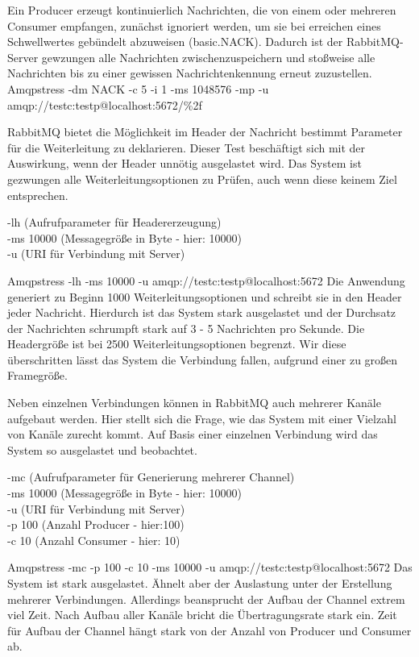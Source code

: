 \documentclass[	a4paper,
			11pt,
			titlepage,
			oneside,
			fleqn,
			listof=totoc,
			parskip,
			chapterprefix=false,
			numbers=noenddot]{scrreprt}
\begin{document}
	
		{Ein Producer erzeugt kontinuierlich Nachrichten, die von einem oder mehreren Consumer empfangen, zunächst ignoriert werden, um sie bei erreichen eines Schwellwertes gebündelt abzuweisen (basic.NACK). Dadurch ist der RabbitMQ-Server gewzungen alle Nachrichten zwischenzuspeichern und stoßweise alle Nachrichten bis zu einer gewissen Nachrichtenkennung erneut zuzustellen.}%
		{}%
		{Amqpstress -dm NACK -c 5 -i 1 -ms 1048576 -mp -u amqp://testc:testp@localhost:5672/\%2f}%
		{}
		
		
		{RabbitMQ bietet die Möglichkeit im Header der Nachricht bestimmt Parameter für die Weiterleitung zu deklarieren. Dieser Test beschäftigt sich mit der Auswirkung, wenn der Header unnötig ausgelastet wird. Das System ist gezwungen alle Weiterleitungsoptionen zu Prüfen, auch wenn diese keinem Ziel entsprechen.}%
		{\parbox[c][1.3cm][c]{10.5cm}{-lh (Aufrufparameter für Headererzeugung) \\ -ms 10000 (Messagegröße in Byte - hier: 10000) \\ -u (URI für Verbindung mit Server)}}%
		{Amqpstress -lh -ms 10000 -u amqp://testc:testp@localhost:5672}%
		{Die Anwendung generiert zu Beginn 1000 Weiterleitungsoptionen und schreibt sie in den Header jeder Nachricht. Hierdurch ist das System stark ausgelastet und der Durchsatz der Nachrichten schrumpft stark auf 3 - 5 Nachrichten pro Sekunde.}
		{Die Headergröße ist bei 2500 Weiterleitungsoptionen begrenzt. Wir diese überschritten lässt das System die Verbindung fallen, aufgrund einer zu großen Framegröße.}
		
		
		{Neben einzelnen Verbindungen können in RabbitMQ auch mehrerer Kanäle aufgebaut werden. Hier stellt sich die Frage, wie das System mit einer Vielzahl von Kanäle zurecht kommt. Auf Basis einer einzelnen Verbindung wird das System so ausgelastet und beobachtet. }%
		{\parbox[c][2cm][c]{10.5cm}{-mc (Aufrufparameter für Generierung mehrerer Channel) \\ -ms 10000 (Messagegröße in Byte - hier: 10000) \\ -u (URI für Verbindung mit Server) \\ -p 100 (Anzahl Producer - hier:100) \\ -c 10 (Anzahl Consumer - hier: 10)}}%
		{Amqpstress -mc -p 100 -c 10 -ms 10000 -u amqp://testc:testp@localhost:5672}%
		{Das System ist stark ausgelastet. Ähnelt aber der Auslastung unter der Erstellung mehrerer Verbindungen. Allerdings beansprucht  der Aufbau der Channel extrem viel Zeit. Nach Aufbau aller Kanäle bricht die Übertragungsrate stark ein.}
		{Zeit für Aufbau der Channel hängt stark von der Anzahl von Producer und Consumer ab.}
\end{document}
